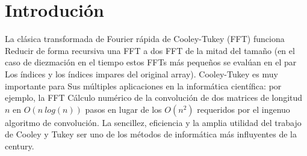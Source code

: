 ﻿\documentclass[10pt]{article}
\begin{document}
\section*{Introdución}
La clásica transformada de Fourier rápida de Cooley-Tukey (FFT) funciona
Reducir de forma recursiva una FFT a dos FFT de la mitad del tamaño (en el caso de diezmación en el tiempo estos FFTs más pequeños se evalúan en el par
Los índices y los índices impares del original array)\cite{cooley: algoritmo}. Cooley-Tukey es muy importante para
Sus múltiples aplicaciones en la informática científica: por ejemplo, la FFT
Cálculo numérico de la convolución de dos matrices de longitud $ n $ en
$O(n \ log (n))$ pasos en lugar de los $O(n ^ 2)$ requeridos por el ingenuo algoritmo de convolución\cite{proakis: introducción}. La sencillez, eficiencia y la amplia utilidad del trabajo de Cooley y Tukey ser uno de los métodos de informática más influyentes de la  century\cite{cipra:best}.
\end{document}
